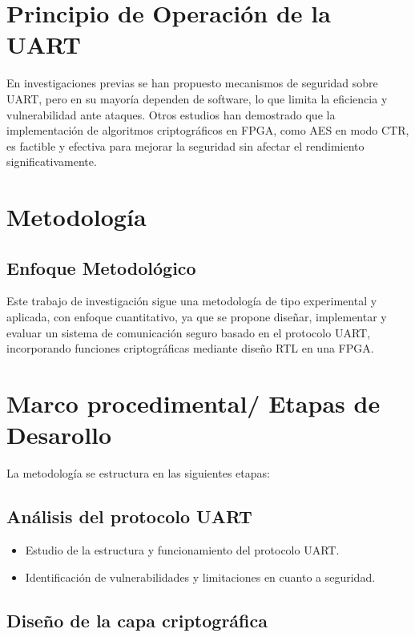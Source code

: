 \section{Principio de Operación de la UART}
En investigaciones previas se han propuesto mecanismos de seguridad sobre UART, pero en su mayoría dependen de software, lo que limita la eficiencia y vulnerabilidad ante ataques. Otros estudios han demostrado que la implementación de algoritmos criptográficos en FPGA, como AES en modo CTR, es factible y efectiva para mejorar la seguridad sin afectar el rendimiento significativamente.



\section{Metodología}
\subsection{Enfoque Metodol\'ogico}

Este trabajo de investigación sigue una metodología de tipo experimental y aplicada, con enfoque cuantitativo, ya que se propone diseñar, implementar y evaluar un sistema de comunicación seguro basado en el protocolo UART, incorporando funciones criptográficas mediante diseño RTL en una FPGA.




\section{Marco procedimental/ Etapas de Desarollo}
La metodología se estructura en las siguientes etapas:



\subsection{Análisis del protocolo UART }

\begin{itemize}
\item Estudio de la estructura y funcionamiento del protocolo UART.
\item Identificación de vulnerabilidades y limitaciones en cuanto a seguridad.
\end{itemize}

\subsection{Diseño de la capa criptogr\'afica }

